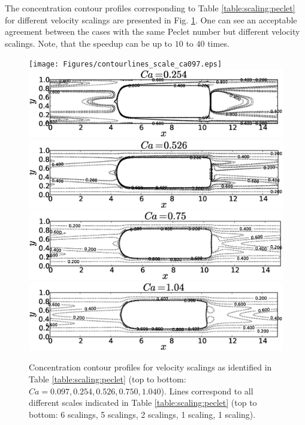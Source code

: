 \documentclass{article}
\begin{document}
The concentration contour profiles corresponding to Table \ref{table:scaling:peclet} for different
velocity scalings are presented in Fig. \ref{fig:contours:scaling:peclet}. One can see an
acceptable agreement between the cases with the same Peclet number but different velocity scalings. Note, that the speedup can be up to $10$ to $40$ times.
\begin{figure}[htb!]
\texttt{[image: Figures/contourlines\_scale\_ca097.eps]}\\
\includegraphics[height=0.25\textwidth]{Figures/contourlines_scale_ca054.eps}\\
\includegraphics[height=0.25\textwidth]{Figures/contourlines_scale_ca026.eps}\\
\includegraphics[height=0.25\textwidth]{Figures/contourlines_scale_ca05.eps}\\
\includegraphics[height=0.25\textwidth]{Figures/contourlines_scale_ca14.eps}\\
\caption{Concentration contour profiles for velocity scalings as identified in Table
\ref{table:scaling:peclet} (top to bottom:
$Ca=0.097,0.254,0.526,0.750,1.040$). Lines correspond to
all different scales indicated in Table
\ref{table:scaling:peclet} (top to bottom: 6 scalings, 5 scalings, 2 scalings, 1 scaling, 1 scaling). \label{fig:contours:scaling:peclet}}
\end{figure}
\end{document}
